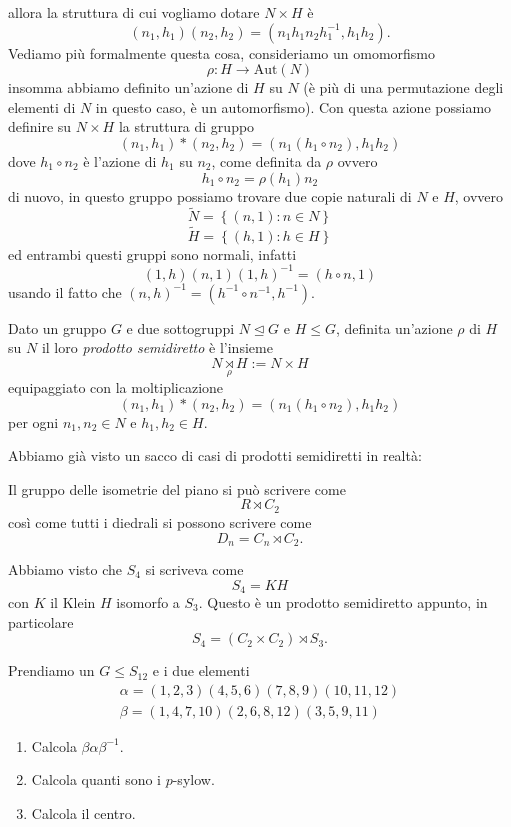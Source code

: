 \documentclass[11pt]{scrartcl}
\newcommand{\normal}{\mathrel{\unlhd}}
\begin{document}
 	allora la struttura di cui vogliamo dotare $N\times H$ è 
 	$$(n_1,h_1)(n_2,h_2)=(n_1h_1n_2h_1^{-1},h_1h_2).$$
	Vediamo più formalmente questa cosa, consideriamo un omomorfismo
	$$\rho:H\to \text{Aut}(N)$$
	insomma abbiamo definito un'azione di $H$ su $N$ (è più di una permutazione degli elementi di $N$ in questo caso, è un automorfismo). Con questa azione possiamo definire su $N\times H$ la struttura di gruppo
	$$\left(n_1,h_1\right)*(n_2,h_2)=\left(n_1\left(h_1\circ n_2\right),h_1h_2\right)$$
	dove $h_1\circ n_2$ è l'azione di $h_1$ su $n_2$, come definita da $\rho$ ovvero
	$$h_1\circ n_2=\rho(h_1)n_2$$
	di nuovo, in questo gruppo possiamo trovare due copie naturali di $N$ e $H$, ovvero
	$$\tilde{N}=\left\{(n,1):n\in N\right\}$$
	$$\tilde{H}=\left\{(h,1):h\in H\right\}$$
	ed entrambi questi gruppi sono normali, infatti
	$$(1,h)(n,1)(1,h)^{-1}=(h\circ n,1)$$
	usando il fatto che $(n,h)^{-1}=(h^{-1}\circ n^{-1},h^{-1})$.
	\begin{definition}
		Dato un gruppo $G$ e due sottogruppi $N\normal G$ e $H\le G$, definita un'azione $\rho$ di $H$ su $N$ il loro \textit{prodotto semidiretto} è l'insieme 
		$$N\underset{\rho}{\rtimes} H :=N\times H$$
		equipaggiato con la moltiplicazione 
		$$\left(n_1,h_1\right)*(n_2,h_2)=\left(n_1\left(h_1\circ n_2\right),h_1h_2\right)$$
		per ogni $n_1,n_2 \in N$ e $h_1,h_2\in H$.
	\end{definition}
	Abbiamo già visto un sacco di casi di prodotti semidiretti in realtà:
	\begin{example}[Diedrale]
		Il gruppo delle isometrie del piano si può scrivere come 
		$$R\rtimes C_2$$
		così come tutti i diedrali si possono scrivere come
		$$D_n=C_n\rtimes C_2.$$
	\end{example}
	\begin{example}[Simmetrici]
		Abbiamo visto che $S_4$ si scriveva come
		$$S_4=KH$$
		con $K$ il Klein $H$ isomorfo a $S_3$. Questo è un prodotto semidiretto appunto, in particolare
		$$S_4=\left(C_2\times C_2\right)\rtimes S_3.$$
	\end{example}
	\begin{exercise}
		Prendiamo un $G\le S_{12}$ e i due elementi
		\begin{gather*}
			\alpha=(1,2,3)(4,5,6)(7,8,9)(10,11,12) \\
			\beta=(1,4,7,10)(2,6,8,12)(3,5,9,11)	
		\end{gather*}
		\begin{enumerate}
			\item  Calcola $\beta \alpha \beta^{-1}$. 
			\item  Calcola quanti sono i $p$-sylow.
			\item  Calcola il centro.
		\end{enumerate}
	\end{exercise}
\end{document}
